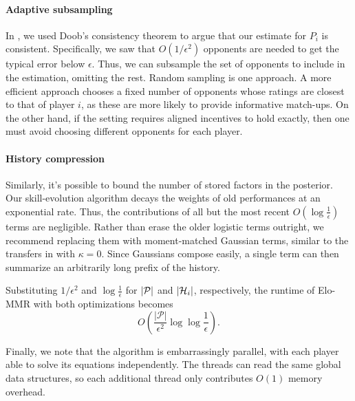 \paragraph{Adaptive subsampling}
In , we used Doob's consistency theorem to argue that our estimate for $P_i$ is consistent. Specifically, we saw that $O(1/\epsilon^2)$ opponents are needed to get the typical error below $\epsilon$. Thus, we can subsample the set of opponents to include in the estimation, omitting the rest. Random sampling is one approach. A more efficient approach chooses a fixed number of opponents whose ratings are closest to that of player $i$, as these are more likely to provide informative match-ups. On the other hand, if the setting requires aligned incentives to hold exactly, then one must avoid choosing different opponents for each player.

\paragraph{History compression}
Similarly, it's possible to bound the number of stored factors in the posterior. Our skill-evolution algorithm decays the weights of old performances at an exponential rate. Thus, the contributions of all but the most recent $O(\log\frac 1\epsilon)$ terms are negligible. Rather than erase the older logistic terms outright, we recommend replacing them with moment-matched Gaussian terms, similar to the transfers in  with $\kappa=0$. Since Gaussians compose easily, a single term can then summarize an arbitrarily long prefix of the history.

Substituting $1/\epsilon^2$ and $\log\frac 1\epsilon$ for $|\mathcal{P}|$ and $|{\mathcal{H}}_i|$, respectively, the runtime of Elo-MMR with both optimizations becomes
\[O\left(\frac {|\mathcal P|}{\epsilon^2} \log\log\frac 1\epsilon\right).\]

Finally, we note that the algorithm is embarrassingly parallel, with each player able to solve its equations independently. The threads can read the same global data structures, so each additional thread only contributes $O(1)$ memory overhead.



